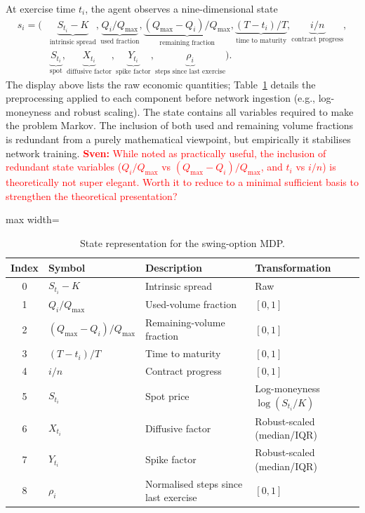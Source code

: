 \documentclass[a4paper,fleqn]{cas-dc}
\begin{document}
At exercise time $t_i$, the agent observes a nine-dimensional state
\begin{equation*}
\begin{aligned}
s_i = \Big(
& \underbrace{S_{t_i} - K}_{\text{intrinsic spread}},
\underbrace{Q_i / Q_{\max}}_{\text{used fraction}},
\underbrace{(Q_{\max} - Q_i) / Q_{\max}}_{\text{remaining fraction}},
\underbrace{(T - t_i)/T}_{\text{time to maturity}},
\underbrace{i/n}_{\text{contract progress}}, \\
& \underbrace{S_{t_i}}_{\text{spot}},
\underbrace{X_{t_i}}_{\text{diffusive factor}},
\underbrace{Y_{t_i}}_{\text{spike factor}},
\underbrace{\rho_i}_{\text{steps since last exercise}}
\Big).
\end{aligned}
\end{equation*}
The display above lists the raw economic quantities; Table~\ref{tab:state_components} details the preprocessing applied to each component before network ingestion (e.g., log-moneyness and robust scaling). The state contains all variables required to make the problem Markov. The inclusion of both used and remaining volume fractions is redundant from a purely mathematical viewpoint, but empirically it stabilises network training. \textcolor{red}{\textbf{Sven:} While noted as practically useful, the inclusion of redundant state variables ($Q_i/Q_{\max}$ vs $(Q_{\max}-Q_i)/Q_{\max}$, and $t_i$ vs $i/n$) is theoretically not super elegant. Worth it to reduce to a minimal sufficient basis to strengthen the theoretical presentation?}

\begin{table}[htbp]
\centering
\caption{State representation for the swing-option MDP.}
\label{tab:state_components}
\begin{adjustbox}{max width=\linewidth}
\begin{tabular}{clll}
\toprule
Index & Symbol & Description & Transformation \\
\midrule
0 & $S_{t_i} - K$ & Intrinsic spread & Raw \\
1 & $Q_i / Q_{\max}$ & Used-volume fraction & $[0,1]$ \\
2 & $(Q_{\max} - Q_i)/Q_{\max}$ & Remaining-volume fraction & $[0,1]$ \\
3 & $(T - t_i)/T$ & Time to maturity & $[0,1]$ \\
4 & $i/n$ & Contract progress & $[0,1]$ \\
5 & $S_{t_i}$ & Spot price & Log-moneyness $\log(S_{t_i}/K)$ \\
6 & $X_{t_i}$ & Diffusive factor & Robust-scaled (median/IQR) \\
7 & $Y_{t_i}$ & Spike factor & Robust-scaled (median/IQR) \\
8 & $\rho_i$ & Normalised steps since last exercise & $[0,1]$ \\
\bottomrule
\end{tabular}
\end{adjustbox}
\end{table}
\end{document}
